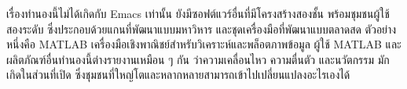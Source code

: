 เรื่องทำนองนี้ไม่ได้เกิดกับ Emacs เท่านั้น
ยังมีซอฟต์แวร์อื่นที่มีโครงสร้างสองชั้น พร้อมชุมชนผู้ใช้สองระดับ
ซึ่งประกอบด้วยแกนที่พัฒนาแบบมหาวิหาร และชุดเครื่องมือที่พัฒนาแบบตลาดสด
ตัวอย่างหนึ่งคือ MATLAB
เครื่องมือเชิงพาณิชย์สำหรับวิเคราะห์และพล็อตภาพข้อมูล ผู้ใช้ MATLAB
และผลิตภัณฑ์อื่นทำนองนี้ต่างรายงานเหมือน  ๆ   กัน ว่าความเคลื่อนไหว
ความตื่นตัว และนวัตกรรม มักเกิดในส่วนที่เปิด
ซึ่งชุมชนที่ใหญ่โตและหลากหลายสามารถเข้าไปเปลี่ยนแปลงอะไรเองได้